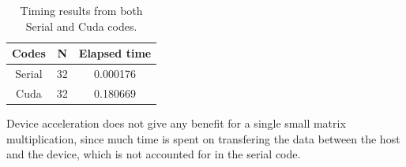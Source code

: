 \documentclass[12pt,a4paper]{article}
\begin{document}
\begin{enumerate}
\begin{table}[H]
	\centering
	\begin{tabular}{|c|c|c|}
		\hline 
	\textbf{	Codes} & \textbf{N} & \textbf{Elapsed time} \\ 
		\hline 
		Serial & 32 & 0.000176  \\ 
		\hline 
		Cuda & 32 & 0.180669  \\ 
		\hline 
	\end{tabular} 
\caption{Timing results from both Serial and Cuda codes.}
\label{table1}
\end{table}

Device acceleration does not give  any benefit for a single small matrix multiplication, since much time is spent on transfering the data between the host and the device, which is not accounted for in the serial code.

\end{enumerate}
\end{document}
